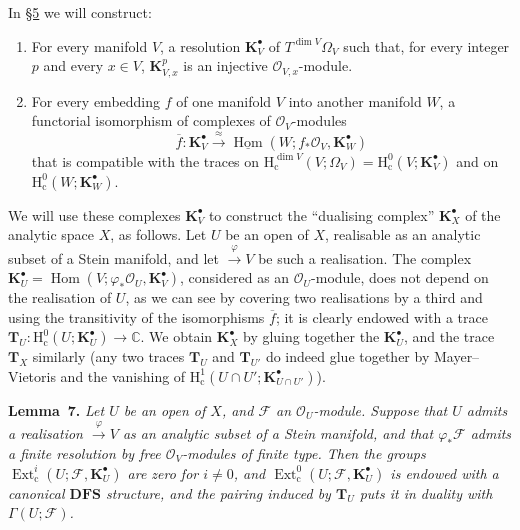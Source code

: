 \documentclass[british]{article}
\newenvironment{itenv}[1]
  {\phantomsection\par\smallskip\noindent\textbf{#1.}\itshape}
  {\par\smallskip}
\begin{document}
In \hyperref[section-5]{§5} we will construct:

\begin{enumerate}
\def\labelenumi{\arabic{enumi}.}
\item
  For every manifold \(V\), a resolution \(\mathbf{K}_V^\bullet\) of
  \(T^{\dim V}\Omega_V\) such that, for every integer \(p\) and every
  \(x\in V\), \(\mathbf{K}_{V,x}^p\) is an injective
  \({\mathscr{O}}_{V,x}\)-module.
\item
  For every embedding \(f\) of one manifold \(V\) into another manifold
  \(W\), a functorial isomorphism of complexes of
  \({\mathscr{O}}_V\)-modules \[
     \overline{f}\colon \mathbf{K}_V^\bullet \xrightarrow{\approx} \underline{\operatorname{Hom}}(W;f_*{\mathscr{O}}_V,\mathbf{K}_W^\bullet)
   \] that is compatible with the traces on
  \(\mathrm{H}_\mathrm{c}^{\dim V}(V;\Omega_V)=\mathrm{H}_\mathrm{c}^0(V;\mathbf{K}_V^\bullet)\)
  and on \(\mathrm{H}_\mathrm{c}^0(W;\mathbf{K}_W^\bullet)\).
\end{enumerate}

We will use these complexes \(\mathbf{K}_V^\bullet\) to construct the
``dualising complex'' \(\mathbf{K}_X^\bullet\) of the analytic space
\(X\), as follows. Let \(U\) be an open of \(X\), realisable as an
analytic subset of a Stein manifold, and let \(\xrightarrow{\varphi}V\)
be such a realisation. The complex
\(\mathbf{K}_U^\bullet=\operatorname{Hom}(V;\varphi_*{\mathscr{O}}_U,\mathbf{K}_V^\bullet)\),
considered as an \({\mathscr{O}}_U\)-module, does not depend on the
realisation of \(U\), as we can see by covering two realisations by a
third and using the transitivity of the isomorphisms \(\overline{f}\);
it is clearly endowed with a trace
\(\mathbf{T}_U\colon\mathrm{H}_\mathrm{c}^0(U;\mathbf{K}_U^\bullet)\to\mathbb{C}\).
We obtain \(\mathbf{K}_X^\bullet\) by gluing together the
\(\mathbf{K}_U^\bullet\), and the trace \(\mathbf{T}_X\) similarly (any
two traces \(\mathbf{T}_U\) and \(\mathbf{T}_{U'}\) do indeed glue
together by Mayer--Vietoris and the vanishing of
\(\mathrm{H}_\mathrm{c}^1(U\cap U';\mathbf{K}_{U\cap U'}^\bullet)\)).

\protect{}\label{lemma-7}
\begin{itenv}{Lemma 7}
Let \(U\) be an open of \(X\), and \({\mathscr{F}}\) an
\({\mathscr{O}}_U\)-module. Suppose that \(U\) admits a realisation
\(\xrightarrow{\varphi}V\) as an analytic subset of a Stein manifold,
and that \(\varphi_*{\mathscr{F}}\) admits a finite resolution by free
\({\mathscr{O}}_V\)-modules of finite type. Then the groups
\(\operatorname{Ext}_\mathrm{c}^i(U;{\mathscr{F}},\mathbf{K}_U^\bullet)\)
are zero for \(i\neq0\), and
\(\operatorname{Ext}_\mathrm{c}^0(U;{\mathscr{F}},\mathbf{K}_U^\bullet)\)
is endowed with a canonical \(\mathbf{DFS}\) structure, and the pairing
induced by \(\mathbf{T}_U\) puts it in duality with
\(\Gamma(U;{\mathscr{F}})\).

\end{itenv}
\end{document}
